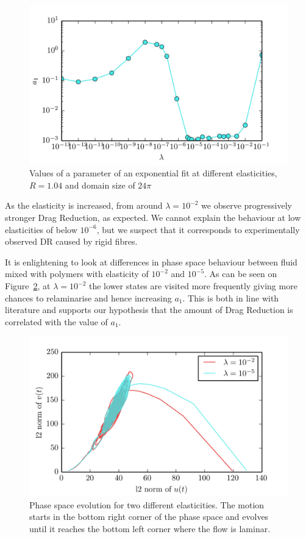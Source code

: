 \documentclass[11pt,a4paper]{article}
\begin{document}
\begin{figure}[H]
    \centering
    \includegraphics[width=\textwidth]{lambdas}
    \caption{Values of a parameter of an exponential fit at different elasticities, $R=1.04$ and domain size of $24\pi$}\label{img:lambdas}
\end{figure}

As the elasticity is increased, from around $\lambda=10^{-2}$ we observe progressively stronger Drag Reduction, as expected\cite{Lee74}.
We cannot explain the behaviour at low elasticities of below $10^{-6}$, but we suspect that it corresponds to experimentally observed DR caused by rigid fibres\cite{Pirith72}\cite{Pashkewitz04}.

It is enlightening to look at differences in phase space behaviour between fluid mixed with polymers with elasticity of $10^{-2}$ and $10^{-5}$.
As can be seen on Figure~\ref{img:phase}, at $\lambda=10^{-2}$ the lower states are visited more frequently giving more chances to relaminarise and hence increasing $a_1$.
This is both in line with literature\cite{Graham04} and supports our hypothesis that the amount of Drag Reduction is correlated with the value of $a_1$.

\begin{figure}[H]
    \centering
    \includegraphics[width=\textwidth]{phase}
    \caption{Phase space evolution for two different elasticities. The motion starts in the bottom right corner of the phase space and evolves until it reaches the bottom left corner where the flow is laminar.}\label{img:phase}
\end{figure}
\end{document}
